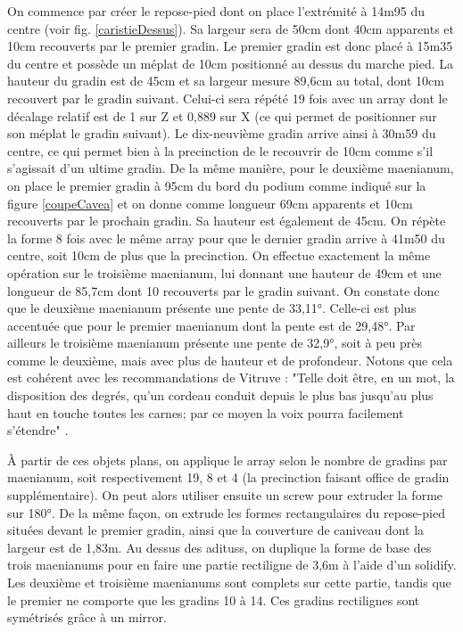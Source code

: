 On commence par créer le repose-pied dont on place l'extrémité à 14m95 du centre (voir fig. \ref{caristieDessus}). Sa largeur sera de 50cm dont 40cm apparents et 10cm recouverts par le premier gradin. Le premier gradin est donc placé à 15m35 du centre et possède un méplat de 10cm positionné au dessus du marche pied. La hauteur du gradin est de 45cm et sa largeur mesure 89,6cm au total, dont 10cm recouvert par le gradin suivant. Celui-ci sera répété 19 fois avec un \gls{array} dont le décalage relatif est de 1 sur Z et 0,889 sur X (ce qui permet de positionner sur son méplat le gradin suivant). Le dix-neuvième gradin arrive ainsi à 30m59 du centre, ce qui permet bien à la \gls{precinction} de le recouvrir de 10cm comme s'il s'agissait d'un ultime gradin. De la même manière, pour le deuxième \gls{maenianum}, on place le premier gradin à 95cm du bord du \gls{podium} comme indiqué sur la figure \ref{coupeCavea} et on donne comme longueur 69cm apparents et 10cm recouverts par le prochain gradin. Sa hauteur est également de 45cm. On répète la forme 8 fois avec le même \gls{array} pour que le dernier gradin arrive à 41m50 du centre, soit 10cm de plus que la  \gls{precinction}. On effectue exactement la même opération sur le troisième \gls{maenianum}, lui donnant une hauteur de 49cm et une longueur de 85,7cm dont 10 recouverts par le gradin suivant. On constate donc que le deuxième \gls{maenianum} présente une pente de 33,11°. Celle-ci est plus accentuée que pour le premier \gls{maenianum} dont la pente est de 29,48°. Par ailleurs le troisième \gls{maenianum} présente une pente de 32,9°, soit à peu près comme le deuxième, mais avec plus de hauteur et de profondeur. Notons que cela est cohérent avec les recommandations de Vitruve : "Telle doit être, en un mot, la disposition des degrés, qu'un cordeau conduit depuis le plus bas jusqu'au plus haut en touche toutes les carnes; par ce moyen la voix pourra facilement s'étendre" \cite[p.5]{vitruve}.

À partir de ces objets plans, on applique le \gls{array} selon le nombre de gradins par \gls{maenianum}, soit respectivement 19, 8 et 4 (la \gls{precinction} faisant office de gradin supplémentaire). On peut alors utiliser ensuite un \gls{screw} pour extruder la forme sur 180°. De la même façon, on extrude les formes rectangulaires du repose-pied situées devant le premier gradin, ainsi que la couverture de caniveau dont la largeur est de 1,83m. Au dessus des \glspl{aditus}, on duplique la forme de base des trois \glspl{maenianum} pour en faire une partie rectiligne de 3,6m à l'aide d'un \gls{solidify}. Les deuxième et troisième \glspl{maenianum} sont complets sur cette partie, tandis que le premier ne comporte que les gradins 10 à 14. Ces gradins rectilignes sont symétrisés grâce à un \gls{mirror}.

